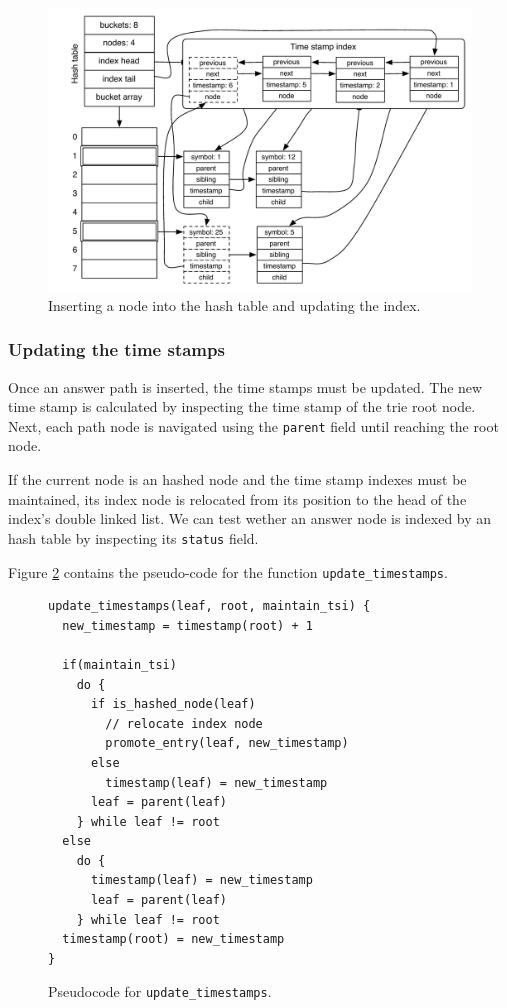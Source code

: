 \begin{figure}[ht]
  \centering
    \includegraphics[scale=0.6]{hash_table_insert.pdf}
  \caption{Inserting a node into the hash table and updating the index.}
  \label{fig:hash_table_insert}
\end{figure}

\subsubsection{Updating the time stamps}

Once an answer path is inserted, the time stamps must be updated.
The new time stamp is calculated by inspecting the time stamp of the trie root node.
Next, each path node is navigated using the \texttt{parent} field until reaching the root node.

If the current node is an hashed node and the time stamp indexes
must be maintained, its index node is relocated from its position to the head of the index's double linked list. We can test wether an answer node is indexed by an hash table by inspecting
its \texttt{status} field.

Figure \ref{fig:update_timestamps} contains the pseudo-code for the function \texttt{update\_timestamps}.

\begin{figure}[ht]
\begin{Verbatim}[fontsize=\small]
update_timestamps(leaf, root, maintain_tsi) {
  new_timestamp = timestamp(root) + 1
  
  if(maintain_tsi)
    do {
      if is_hashed_node(leaf)
        // relocate index node
        promote_entry(leaf, new_timestamp)
      else
        timestamp(leaf) = new_timestamp
      leaf = parent(leaf)
    } while leaf != root
  else
    do {
      timestamp(leaf) = new_timestamp
      leaf = parent(leaf)
    } while leaf != root
  timestamp(root) = new_timestamp
}
\end{Verbatim}
\caption{Pseudo\-code for \texttt{update\_timestamps}.}
\label{fig:update_timestamps}
\end{figure}

